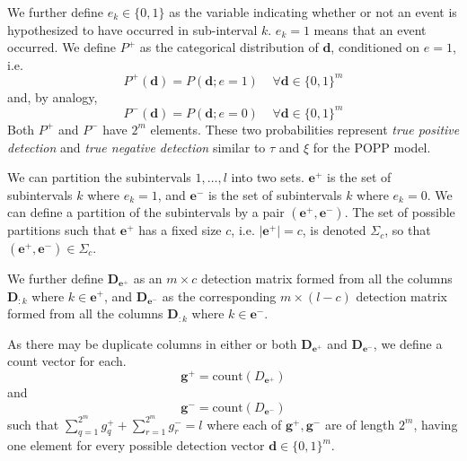 We further define $e_k \in \{0, 1\}$ as the variable indicating whether or not an event is hypothesized to have occurred in sub-interval $k$. $e_k = 1$ means that an event occurred. We define $P^{+}$ as the categorical distribution of $\mathbf{d}$, conditioned on $e = 1$, i.e.
\begin{equation}
	\label{eq:joint_sensor_model_positive_event}
	P^+(\mathbf{d}) = P(\mathbf{d} ; e = 1) ~~~~~ \forall \mathbf{d} \in \{0, 1\}^m
\end{equation} 
\noindent and, by analogy,
\begin{equation}
	\label{eq:joint_sensor_model_negative_event}
	P^-(\mathbf{d}) = P(\mathbf{d} ; e = 0) ~~~~~ \forall \mathbf{d} \in \{0, 1\}^m
\end{equation}
\noindent Both $P^+$ and $P^-$ have $2^m$ elements. These two probabilities represent \textit{true positive detection} and \textit{true negative detection}  similar to $\tau$ and $\xi$ for the POPP model.

We can partition the subintervals $1, \ldots, l$ into two sets. $\mathbf{e}^+$ is the set of subintervals $k$ where $e_k = 1$, and $\mathbf{e}^-$ is the set of subintervals $k$ where $e_k = 0$. We can define a partition of the subintervals by a pair $(\mathbf{e}^+, \mathbf{e}^-)$. The set of possible partitions such that $\mathbf{e}^+$ has a fixed size $c$, i.e. $\mid \mathbf{e}^+ \mid = c$, is denoted $\Sigma_c$, so that $(\mathbf{e}^+, \mathbf{e}^-) \in \Sigma_c$.

We further define $\mathbf{D}_{\mathbf{e}^+}$ as an $m \times c$ detection matrix formed from all the columns $\mathbf{D}_{:k}$ where $k \in \mathbf{e}^+$, and $\mathbf{D}_{\mathbf{e}^-}$ as the corresponding $m \times (l - c)$ detection matrix formed from all the columns $\mathbf{D}_{:k}$ where $k \in \mathbf{e}^-$.

As there may be duplicate columns in either or both $\mathbf{D}_{\mathbf{e}^+}$ and $\mathbf{D}_{\mathbf{e}^-}$, we define a count vector for each.
\begin{equation*}
	\mathbf{g}^+ = \textrm{count}(D_{\mathbf{e}^+})
\end{equation*}
\noindent and
\begin{equation*}
	\mathbf{g}^- = \textrm{count}(D_{\mathbf{e}^-})
\end{equation*}
\noindent such that $\sum\limits_{q=1}^{2^m} g_q^+ + \sum\limits_{r=1}^{2^m} g_r^- = l$ where each of $\mathbf{g}^+, \mathbf{g}^-$ are of length $2^m$, having one element for every possible detection vector $\mathbf{d} \in \{0, 1\}^m$.

